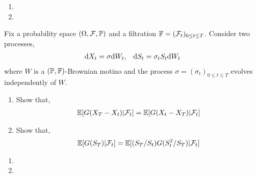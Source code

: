 \begin{solution}[Solution]
\begin{enumerate}[label=(\alph*)]
    \item 
    \item 
\end{enumerate}
\end{solution}


\begin{problem}
    Fix a probability space \( (\Omega,\mathcal{F},\mathbb{P}) \) and a filtration \( \mathbb{F} = (\mathcal{F}_t)_{0\leq t\leq T} \). Consider two processes,
    \begin{align*}
        \mathrm{d} X_t = \sigma \mathrm{d} W_t, && \mathrm{d} S_t = \sigma_t S_t \mathrm{d} W_t
    \end{align*}
    where \( W \) is a \( (\mathbb{P},\mathbb{F}) \)-Brownian motino and the process \( \sigma = (\sigma_t)_{0\leq t\leq T} \) evolves independently of \( W \).
\begin{enumerate}[nolistsep,label=(\alph*)]
    \item Show that,
        \begin{align*}
            \mathbb{E}[G(X_T-X_t)|\mathcal{F}_t] = \mathbb{E}[G(X_t-X_T)|\mathcal{F}_t]
        \end{align*}
    \item Show that,
        \begin{align*}
            \mathbb{E}[G(S_T)|\mathcal{F}_t] = \mathbb{E}[(S_T/S_t) G(S_t^2/S_T) | \mathcal{F}_t]
        \end{align*}
        
\end{enumerate}

\end{problem}

\begin{solution}[Solution]
\begin{enumerate}[label=(\alph*)]
    \item 
    \item 
\end{enumerate}
\end{solution}


